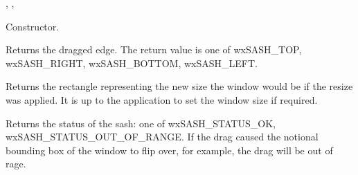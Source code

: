
,\rtfsp
{},\rtfsp
{}




Constructor.

\label{wxsasheventgetedge}


Returns the dragged edge. The return value is one of wxSASH\_TOP, wxSASH\_RIGHT, wxSASH\_BOTTOM, wxSASH\_LEFT.

\label{wxsasheventgetdragrect}


Returns the rectangle representing the new size the window would be if the resize was applied. It is
up to the application to set the window size if required.

\label{wxsasheventgetdragstatus}


Returns the status of the sash: one of wxSASH\_STATUS\_OK, wxSASH\_STATUS\_OUT\_OF\_RANGE.
If the drag caused the notional bounding box of the window to flip over, for example, the drag will be out of rage.



